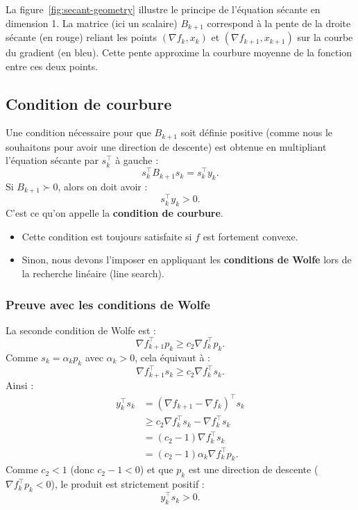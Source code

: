 \begin{figureexplanation}
La figure~\ref{fig:secant-geometry} illustre le principe de l'équation sécante en dimension 1. La matrice (ici un scalaire) $B_{k+1}$ correspond à la pente de la droite sécante (en rouge) reliant les points $(\nabla f_k, x_k)$ et $(\nabla f_{k+1}, x_{k+1})$ sur la courbe du gradient (en bleu). Cette pente approxime la courbure moyenne de la fonction entre ces deux points.
\end{figureexplanation}

\subsection{Condition de courbure}

Une condition nécessaire pour que $B_{k+1}$ soit définie positive (comme nous le souhaitons pour avoir une direction de descente) est obtenue en multipliant l'équation sécante par $s_k^\top$ à gauche :
\[
    s_k^\top B_{k+1} s_k = s_k^\top y_k.
\]
Si $B_{k+1} \succ 0$, alors on doit avoir :
\begin{equation}
    s_k^\top y_k > 0.
\end{equation}
C'est ce qu'on appelle la \textbf{condition de courbure}.

\begin{itemize}
    \item Cette condition est toujours satisfaite si $f$ est fortement convexe.
    \item Sinon, nous devons l'imposer en appliquant les \textbf{conditions de Wolfe} lors de la recherche linéaire (line search).
\end{itemize}

\subsubsection{Preuve avec les conditions de Wolfe}

La seconde condition de Wolfe est :
\begin{equation}
    \nabla f_{k+1}^\top p_k \ge c_2 \nabla f_k^\top p_k.
\end{equation}
Comme $s_k = \alpha_k p_k$ avec $\alpha_k > 0$, cela équivaut à :
\[
    \nabla f_{k+1}^\top s_k \ge c_2 \nabla f_k^\top s_k.
\]
Ainsi :
\begin{align*}
    y_k^\top s_k
    &= (\nabla f_{k+1} - \nabla f_k)^\top s_k \\
    &\ge c_2 \nabla f_k^\top s_k - \nabla f_k^\top s_k \\
    &= (c_2 - 1) \nabla f_k^\top s_k \\
    &= (c_2 - 1) \alpha_k \nabla f_k^\top p_k.
\end{align*}
Comme $c_2 < 1$ (donc $c_2 - 1 < 0$) et que $p_k$ est une direction de descente ($\nabla f_k^\top p_k < 0$), le produit est strictement positif :
\[
    y_k^\top s_k > 0.
\]

